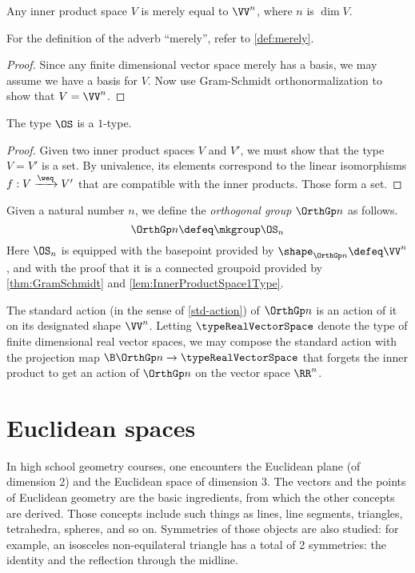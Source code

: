 \begin{theorem}\label{thm:GramSchmidt}
  Any inner product space $V$ is merely equal to $\VV^n$, where $n$ is $\dim V$.
\end{theorem}

For the definition of the adverb ``merely'', refer to \cref{def:merely}.

\begin{proof}
  Since any finite dimensional vector space merely has a basis, we may assume
  we have a basis for $V$.  Now use Gram-Schmidt orthonormalization to show
  that $V = \VV^n$.
\end{proof}

\begin{lemma}\label{lem:InnerProductSpace1Type}
  The type $\OS$ is a $1$-type.
\end{lemma}

\begin{proof}
  Given two inner product spaces $V$ and $V'$, we must show that the type
  $V=V'$ is a set.  By univalence, its elements correspond to the linear
  isomorphisms $f : V \xrightarrow \weq V'$ that are compatible with the
  inner products.  Those form a set.
\end{proof}

\begin{definition}\label{def:OrthogonalGroup}
  Given a natural number $n$, we define the {\em orthogonal group} $\OrthGp n$
  as follows.
  $$\OrthGp n \defeq \mkgroup \OS_n$$
  Here $\OS_n$ is equipped with the basepoint provided by $\shape_{\OrthGp n} \defeq \VV^n$, and with the
  proof that it is a connected groupoid provided by \cref{thm:GramSchmidt} and
  \cref{lem:InnerProductSpace1Type}.
\end{definition}

The standard action (in the sense of \cref{std-action}) of $\OrthGp n$ is an
action of it on its designated shape $\VV^n$.  Letting $\typeRealVectorSpace$ denote
the type of finite dimensional real vector spaces, we may compose the standard
action with the projection map $\B \OrthGp n \to \typeRealVectorSpace$ that
forgets the inner product to get an action of $\OrthGp n$ on the vector space
$\RR^n$.

\section{Euclidean spaces}

In high school geometry courses, one encounters the Euclidean plane (of
dimension 2) and the Euclidean space of dimension 3.  The vectors and the
points of Euclidean geometry are the basic ingredients, from which the other
concepts are derived.  Those concepts include such things as lines, line
segments, triangles, tetrahedra, spheres, and so on.  Symmetries of those
objects are also studied: for example, an isosceles non-equilateral triangle has
a total of 2 symmetries: the identity and the reflection through the midline.

